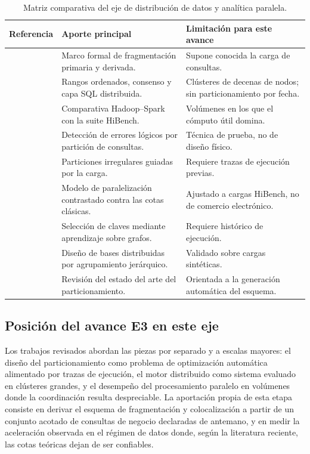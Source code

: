 \documentclass[12pt]{article}
\begin{document}
    \begin{table}[htbp]
        \centering
        \caption{Matriz comparativa del eje de distribución de datos y analítica paralela.}
        \label{tab:estado_arte_distribucion}
        \small
        \begin{tabularx}{\textwidth}{p{3cm} X X}
\toprule
\textbf{Referencia} & \textbf{Aporte principal} & \textbf{Limitación para este avance} \\
\midrule
\textcite{ozsu2020} & Marco formal de fragmentación primaria y derivada. & Supone conocida la carga de consultas. \\
\textcite{taft2020} & Rangos ordenados, consenso y capa SQL distribuida. & Clústeres de decenas de nodos; sin particionamiento por fecha. \\
\textcite{ahmed2020} & Comparativa Hadoop--Spark con la suite HiBench. & Volúmenes en los que el cómputo útil domina. \\
\textcite{rigger2020querypartitioning} & Detección de errores lógicos por partición de consultas. & Técnica de prueba, no de diseño físico. \\
\textcite{kang2021jigsaw} & Particiones irregulares guiadas por la carga. & Requiere trazas de ejecución previas. \\
\textcite{ahmed2021} & Modelo de paralelización contrastado contra las cotas clásicas. & Ajustado a cargas HiBench, no de comercio electrónico. \\
\textcite{zhou2023grep} & Selección de claves mediante aprendizaje sobre grafos. & Requiere histórico de ejecución. \\
\textcite{abdalla2023} & Diseño de bases distribuidas por agrupamiento jerárquico. & Validado sobre cargas sintéticas. \\
\textcite{liu2024} & Revisión del estado del arte del particionamiento. & Orientada a la generación automática del esquema. \\
\bottomrule
        \end{tabularx}
    \end{table}

    \subsection{Posición del avance E3 en este eje}

    Los trabajos revisados abordan las piezas por separado y a escalas mayores: el diseño del particionamiento como problema de optimización automática alimentado por trazas de ejecución, el motor distribuido como sistema evaluado en clústeres grandes, y el desempeño del procesamiento paralelo en volúmenes donde la coordinación resulta despreciable. La aportación propia de esta etapa consiste en derivar el esquema de fragmentación y colocalización a partir de un conjunto acotado de consultas de negocio declaradas de antemano, y en medir la aceleración observada en el régimen de datos donde, según la literatura reciente, las cotas teóricas dejan de ser confiables.
\end{document}
